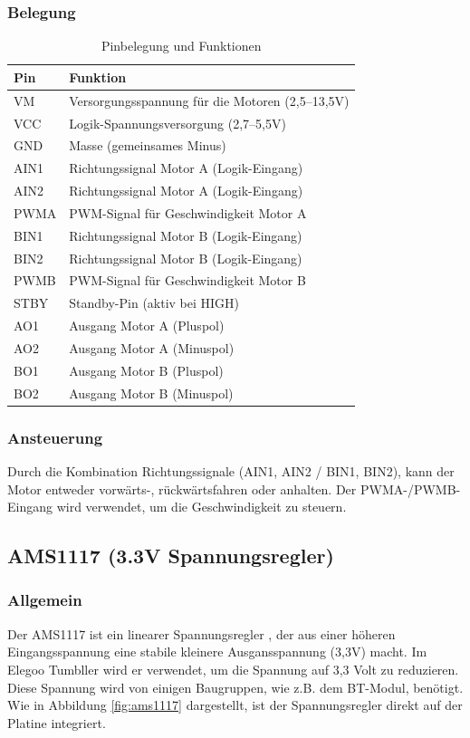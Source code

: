 \subsubsection{Belegung}
\begin{table}[h]
    \centering
    \begin{tabular}{|l|p{10cm}|}
    \hline
    \textbf{Pin} & \textbf{Funktion} \\
    \hline
    VM    & Versorgungsspannung für die Motoren (2,5–13,5V) \\
    VCC   & Logik-Spannungsversorgung (2,7–5,5V) \\
    GND   & Masse (gemeinsames Minus) \\
    AIN1  & Richtungssignal Motor A (Logik-Eingang) \\
    AIN2  & Richtungssignal Motor A (Logik-Eingang) \\
    PWMA  & PWM-Signal für Geschwindigkeit Motor A \\
    BIN1  & Richtungssignal Motor B (Logik-Eingang) \\
    BIN2  & Richtungssignal Motor B (Logik-Eingang) \\
    PWMB  & PWM-Signal für Geschwindigkeit Motor B \\
    STBY  & Standby-Pin (aktiv bei HIGH) \\
    AO1   & Ausgang Motor A (Pluspol) \\
    AO2   & Ausgang Motor A (Minuspol) \\
    BO1   & Ausgang Motor B (Pluspol) \\
    BO2   & Ausgang Motor B (Minuspol) \\
    \hline
    \end{tabular}
    \caption{Pinbelegung und Funktionen}
    \end{table}

\subsubsection{Ansteuerung}
Durch die Kombination Richtungssignale (AIN1, AIN2 / BIN1, BIN2),
kann der Motor entweder vorwärts-, rückwärtsfahren oder anhalten.
%
Der PWMA-/PWMB-Eingang wird verwendet, um die Geschwindigkeit zu steuern.
%
\subsection{AMS1117 (3.3V Spannungsregler)}
%
\subsubsection{Allgemein}
Der AMS1117 ist ein linearer Spannungsregler \cite{ams-1117},
der aus einer höheren Eingangsspannung eine stabile kleinere Ausgansspannung (3,3V) macht.
%
Im Elegoo Tumbller wird er verwendet,
um die Spannung auf 3,3 Volt zu reduzieren.
%
Diese Spannung wird von einigen Baugruppen, wie z.B. dem BT-Modul, benötigt.
%
Wie in Abbildung \ref{fig:ams1117} dargestellt,
ist der Spannungsregler direkt auf der Platine integriert.
